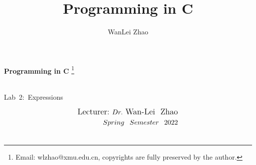 \documentclass[t]{beamer}
\title{Programming in C}
\author{WanLei Zhao}
\newcommand\blfootnote[1]{
  \begingroup
  \renewcommand\thefootnote{}\footnote{#1}
  \addtocounter{footnote}{-1}
  \endgroup
}
\begin{document}
\begin{frame}
   \begin{center}
    \vspace{24pt}
    \Huge\textbf{Programming in C}\blfootnote{Email: wlzhao@xmu.edu.cn, copyrights are fully preserved by the author.}\\
     \Huge{\mbox{Lab 2: }Expressions}
    \vspace{36pt}
  \end{center}
  \begin{align*}
   \vspace{18pt}
      \large{\mbox{Lecturer:}~Dr.~\mbox{Wan-Lei~~Zhao}} \\
      \large{Spring~~Semester~~2022} \\
   \vspace{30pt}
  \end{align*}
\end{frame}



\end{document}
